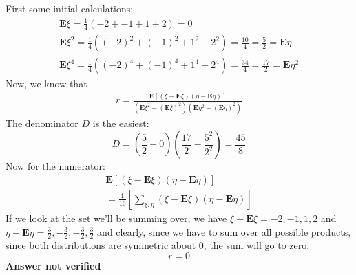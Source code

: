 \subsection{}
First some initial calculations:
\begin{eqnarray}
	\textbf{E}\xi = \frac{1}{4} \left( -2+-1+1+2  \right) = 0 \\
	\textbf{E}\xi^2 = \frac{1}{4} \left( (-2)^2+(-1)^2+1^2+2^2  \right) = \frac{10}{4} = \frac{5}{2} = \textbf{E}\eta \\
	\textbf{E}\xi^4 = \frac{1}{4} \left( (-2)^4+(-1)^4+1^4+2^4  \right) = \frac{34}{4} = \frac{17}{2} = \textbf{E}\eta^2
\end{eqnarray}
Now, we know that
\begin{eqnarray}
	r = \frac{\textbf{E} \left[ (\xi - \textbf{E}\xi)(\eta - \textbf{E}\eta)  \right]}{(\textbf{E}\xi^2 - (\textbf{E}\xi)^2)(\textbf{E}\eta^2 - (\textbf{E}\eta)^2)}
\end{eqnarray}
The denominator $D$ is the easiest:
\begin{equation}
	D = \left( \frac{5}{2} - 0 \right)\left( \frac{17}{2} - \frac{5^2}{2^2} \right) = \frac{45}{8}
\end{equation}
Now for the numerator:
\begin{eqnarray}
	\textbf{E} \left[ (\xi - \textbf{E}\xi)(\eta - \textbf{E}\eta)  \right] \\
	= \frac{1}{16} \left[  \sum_{\xi, \eta} (\xi - \textbf{E}\xi)(\eta - \textbf{E}\eta)      \right]
\end{eqnarray}
If we look at the set we'll be summing over, we have ${\xi - \textbf{E}\xi} = -2, -1, 1, 2$ and ${\eta - \textbf{E}\eta} = \frac{3}{2}, -\frac{3}{2}, -\frac{3}{2}, \frac{3}{2}$ and clearly, since we have to sum over all possible products, since both distributions are symmetric about 0, the sum will go to zero.
\begin{equation}
	r=0
\end{equation}
\textbf{Answer not verified}

